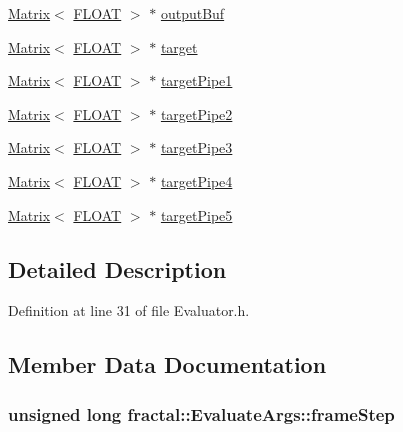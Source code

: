 \begin{DoxyCompactItemize}
\hyperlink{classfractal_1_1Matrix}{Matrix}$<$ \hyperlink{namespacefractal_a1c2d2530689575d5ccb56bae52af70d3}{F\+L\+O\+A\+T} $>$ $\ast$ \hyperlink{classfractal_1_1EvaluateArgs_a865c5f2cd3bdea63ce35ff7be47efae0}{output\+Buf}
\item 
\hyperlink{classfractal_1_1Matrix}{Matrix}$<$ \hyperlink{namespacefractal_a1c2d2530689575d5ccb56bae52af70d3}{F\+L\+O\+A\+T} $>$ $\ast$ \hyperlink{classfractal_1_1EvaluateArgs_a95bd723535f23bee00ea69b3f5e6757e}{target}
\item 
\hyperlink{classfractal_1_1Matrix}{Matrix}$<$ \hyperlink{namespacefractal_a1c2d2530689575d5ccb56bae52af70d3}{F\+L\+O\+A\+T} $>$ $\ast$ \hyperlink{classfractal_1_1EvaluateArgs_abbb5bcd9a0f6ac125ba51bb0d1549734}{target\+Pipe1}
\item 
\hyperlink{classfractal_1_1Matrix}{Matrix}$<$ \hyperlink{namespacefractal_a1c2d2530689575d5ccb56bae52af70d3}{F\+L\+O\+A\+T} $>$ $\ast$ \hyperlink{classfractal_1_1EvaluateArgs_a5503443ded604e0f95343f3b6194467b}{target\+Pipe2}
\item 
\hyperlink{classfractal_1_1Matrix}{Matrix}$<$ \hyperlink{namespacefractal_a1c2d2530689575d5ccb56bae52af70d3}{F\+L\+O\+A\+T} $>$ $\ast$ \hyperlink{classfractal_1_1EvaluateArgs_a938e15436e08cad34ad4e3a4fd434074}{target\+Pipe3}
\item 
\hyperlink{classfractal_1_1Matrix}{Matrix}$<$ \hyperlink{namespacefractal_a1c2d2530689575d5ccb56bae52af70d3}{F\+L\+O\+A\+T} $>$ $\ast$ \hyperlink{classfractal_1_1EvaluateArgs_af2b1a8c78b4080660bdf0c7753d9252e}{target\+Pipe4}
\item 
\hyperlink{classfractal_1_1Matrix}{Matrix}$<$ \hyperlink{namespacefractal_a1c2d2530689575d5ccb56bae52af70d3}{F\+L\+O\+A\+T} $>$ $\ast$ \hyperlink{classfractal_1_1EvaluateArgs_abe97827806053e234d60751979a87a39}{target\+Pipe5}
\end{DoxyCompactItemize}


\subsection{Detailed Description}


Definition at line 31 of file Evaluator.\+h.



\subsection{Member Data Documentation}
\hypertarget{classfractal_1_1EvaluateArgs_ad1a758b48f7b8980d205cc0d2184aca7}{
\subsubsection[{frame\+Step}]{\setlength{\rightskip}{0pt plus 5cm}unsigned long fractal\+::\+Evaluate\+Args\+::frame\+Step}}\label{classfractal_1_1EvaluateArgs_ad1a758b48f7b8980d205cc0d2184aca7}


